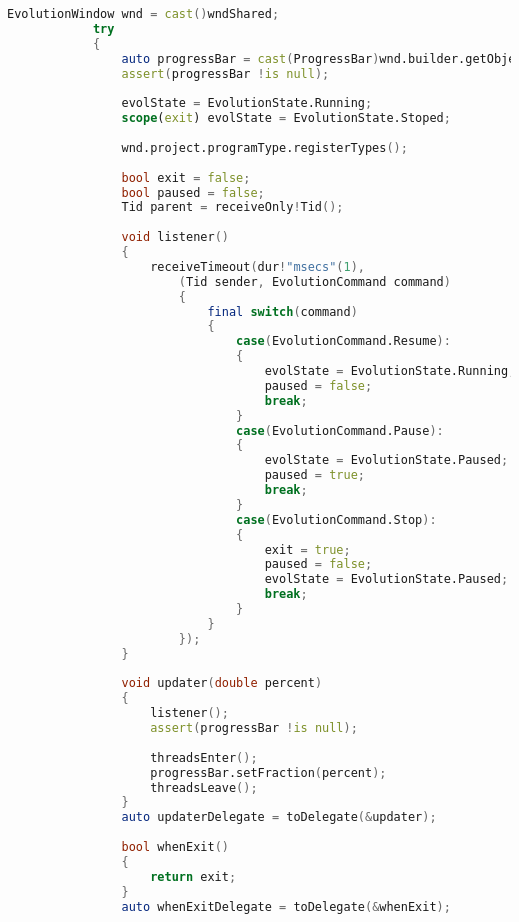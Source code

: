 \documentclass[russian,utf8,emptystyle]{eskdtext}
\begin{document}
\begin{lstlisting}[language=D]
            EvolutionWindow wnd = cast()wndShared;
            try
            {
                auto progressBar = cast(ProgressBar)wnd.builder.getObject("EvolutionProgressBar");
                assert(progressBar !is null);
            
                evolState = EvolutionState.Running;
                scope(exit) evolState = EvolutionState.Stoped;
                
                wnd.project.programType.registerTypes();
                
                bool exit = false;
                bool paused = false;
                Tid parent = receiveOnly!Tid();
                
                void listener()
                {
                    receiveTimeout(dur!"msecs"(1),
                        (Tid sender, EvolutionCommand command)
                        {
                            final switch(command)
                            {
                                case(EvolutionCommand.Resume):
                                {
                                    evolState = EvolutionState.Running;
                                    paused = false;
                                    break;
                                }
                                case(EvolutionCommand.Pause):
                                {
                                    evolState = EvolutionState.Paused;
                                    paused = true;
                                    break;
                                }
                                case(EvolutionCommand.Stop):
                                {
                                    exit = true;
                                    paused = false;
                                    evolState = EvolutionState.Paused;
                                    break;
                                }
                            }
                        });
                }
                
                void updater(double percent)
                {
                    listener();
                    assert(progressBar !is null);
                    
                    threadsEnter();
                    progressBar.setFraction(percent);
                    threadsLeave();
                }
                auto updaterDelegate = toDelegate(&updater);
                
                bool whenExit()
                {
                    return exit;
                }
                auto whenExitDelegate = toDelegate(&whenExit);
                

\end{lstlisting}
\end{document}
